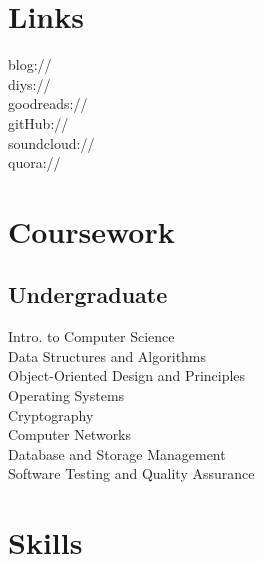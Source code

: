 \documentclass[hidelinks]{deedy-resume-openfont}
\renewcommand{\sectionsep}[0]{\vspace{8pt}}
\begin{document}
\begin{minipage}[t]{0.33\textwidth}
\section{Links}
blog:// \href{http://swlogs.me/blog}{} \\
diys:// \href{http://swlogs.me/diys}{} \\
goodreads://  \href{https://goodreads.com/rihbyne}{} \\ 
gitHub:// \href{https://github.com/rihbyne}{} \\
soundcloud:// \href{http://www.soundcloud.com/rihbyne}{} \\
quora://  \href{https://www.quora.com/Rihan-Pereira}{}


\section{Coursework}
\subsection{Undergraduate}
Intro. to Computer Science\\
Data Structures and Algorithms\\ 
Object-Oriented Design and Principles\\
Operating Systems\\
Cryptography \\
Computer Networks \\
Database and Storage Management \\
Software Testing and Quality Assurance
\sectionsep


\section{Skills}

\end{minipage}
\end{document}
